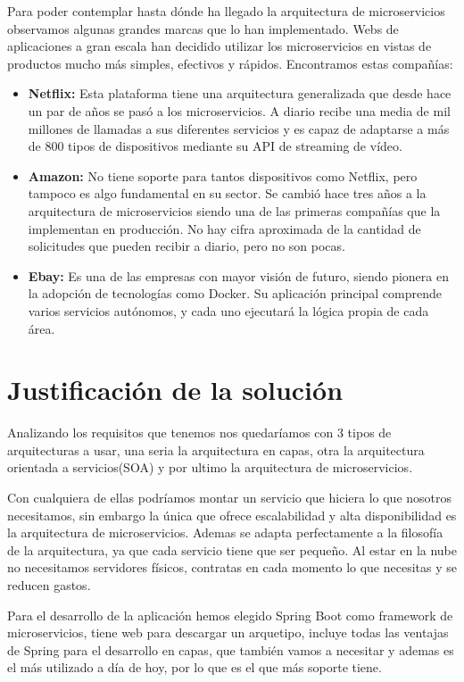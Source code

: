 \documentclass[12pt]{report} %
\begin{document}
Para poder contemplar hasta dónde ha llegado la arquitectura de microservicios observamos algunas grandes marcas que lo han implementado. Webs de aplicaciones a gran escala han decidido utilizar los microservicios en vistas de productos mucho más simples, efectivos y rápidos. Encontramos estas compañías:
\begin{itemize}
	\item \textbf{Netflix:} Esta plataforma tiene una arquitectura generalizada que desde hace un par de años se pasó a los microservicios. A diario recibe una media de mil millones de llamadas a sus diferentes servicios y es capaz de adaptarse a más de 800 tipos de dispositivos mediante su API de streaming de vídeo.
	\item \textbf{Amazon:} No tiene soporte para tantos dispositivos como Netflix, pero tampoco es algo fundamental en su sector. Se cambió hace tres años a la arquitectura de microservicios siendo una de las primeras compañías que la implementan en producción. No hay cifra aproximada de la cantidad de solicitudes que pueden recibir a diario, pero no son pocas. 
	\item \textbf{Ebay:} Es una de las empresas con mayor visión de futuro, siendo pionera en la adopción de tecnologías como Docker. Su aplicación principal comprende varios servicios autónomos, y cada uno ejecutará la lógica propia de cada área.
\end{itemize}


\chapter{Justificación de la solución}

Analizando los requisitos que tenemos nos quedaríamos con 3 tipos de arquitecturas a usar, una seria la arquitectura en capas, otra la arquitectura orientada a servicios(SOA) y por ultimo la arquitectura de microservicios. 

Con cualquiera de ellas podríamos montar un servicio que hiciera lo que nosotros necesitamos, sin embargo la única que ofrece escalabilidad y alta disponibilidad es la arquitectura de microservicios. Ademas se adapta perfectamente a la filosofía de la arquitectura, ya que cada servicio tiene que ser pequeño. Al estar en la nube no necesitamos servidores físicos, contratas en cada momento lo que necesitas y se reducen gastos.

Para el desarrollo de la aplicación hemos elegido Spring Boot como framework de microservicios, tiene web para descargar un arquetipo, incluye todas las ventajas de Spring para el desarrollo en capas, que también vamos a necesitar y ademas es el más utilizado a día de hoy, por lo que es el que más soporte tiene.
\end{document}
